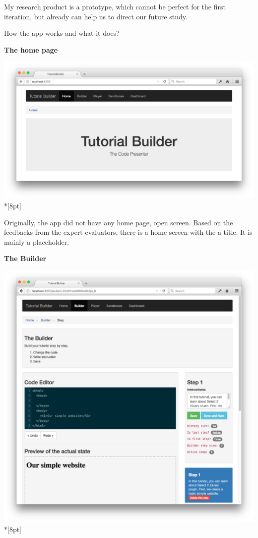 \documentclass[12pt, a4paper, oneside, openright, medskipamount]{report}
\begin{document}
My research product is a prototype, which cannot be perfect for the first iteration, but already can help us to direct our future study.

How the app works and what it does?

\newpage

\textbf{The home page}

\includegraphics[width=1\textwidth]{assets/tour-screenshots/home-page.png}\\*[8pt]

Originally, the app did not have any home page, open screen. Based on the feedbacks from the expert evaluators, there is a home screen with the a title. It is mainly a placeholder.

\newpage

\textbf{The Builder}

\includegraphics[width=1\textwidth]{assets/tour-screenshots/the-builder.png}\\*[8pt]
\end{document}
